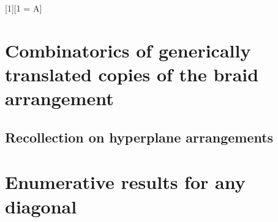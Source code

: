 
[1][1 = A]{} %

\section{Combinatorics of generically translated copies of the braid arrangement}
\label{sec:kBraidArrangement}

\subsection{Recollection on hyperplane arrangements}
\label{subsec:arrangements}

%
%


\section{Enumerative results for any diagonal} 
\label{s:facets}

